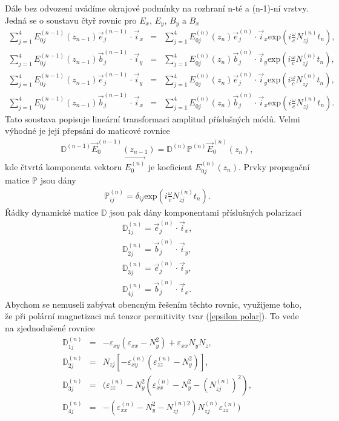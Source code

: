 Dále bez odvození uvádíme okrajové podmínky na rozhraní n-té a (n-1)-ní vrstvy. Jedná se o soustavu čtyř rovnic pro $E_x$, $E_y$, $B_y$ a $B_x$
\begin{eqnarray}
\sum^4_{j=1}E_{0j}^{(n-1)}(z_{n-1})\vec{e}_j^{(n-1)}\cdot\vec{i}_x &=& \sum^4_{j=1}E_{0j}^{(n)}(z_n)\vec{e}_j^{(n)}\cdot\vec{i}_x \mbox{exp}\left(i\frac{\omega}{c}N_{zj}^{(n)}t_n\right), \\
\sum^4_{j=1}E_{0j}^{(n-1)}(z_{n-1})\vec{b}_j^{(n-1)}\cdot\vec{i}_y &=& \sum^4_{j=1}E_{0j}^{(n)}(z_n)\vec{b}_j^{(n)}\cdot\vec{i}_y \mbox{exp}\left(i\frac{\omega}{c}N_{zj}^{(n)}t_n\right), \\
\sum^4_{j=1}E_{0j}^{(n-1)}(z_{n-1})\vec{e}_j^{(n-1)}\cdot\vec{i}_y &=& \sum^4_{j=1}E_{0j}^{(n)}(z_n)\vec{e}_j^{(n)}\cdot\vec{i}_y \mbox{exp}\left(i\frac{\omega}{c}N_{zj}^{(n)}t_n\right), \\
\sum^4_{j=1}E_{0j}^{(n-1)}(z_{n-1})\vec{b}_j^{(n-1)}\cdot\vec{i}_x &=& \sum^4_{j=1}E_{0j}^{(n)}(z_n)\vec{b}_j^{(n)}\cdot\vec{i}_x \mbox{exp}\left(i\frac{\omega}{c}N_{zj}^{(n)}t_n\right).
\end{eqnarray}
Tato soustava popisuje lineární transformaci amplitud příslušných módů. Velmi výhodné je její přepsání do maticové rovnice
\begin{eqnarray}
\mathbb{D}^{(n-1)}\vec{E}_0^{(n-1)}(z_{n-1})=\mathbb{D}^{(n)}\mathbb{P}^{(n)}\vec{E}^{(n)}_0(z_n),
\end{eqnarray}
kde čtvrtá komponenta vektoru $\vec{E_0^{(n)}}$ je koeficient $E^{(n)}_{0j}(z_n)$. Prvky propagační matice $\mathbb{P}$ jsou dány
\begin{eqnarray}
\mathbb{P}_{ij}^{(n)}=\delta_{ij} \mbox{exp}\left(i\frac{\omega}{c}N_{zj}^{(n)}t_n\right).
\end{eqnarray}
Řádky dynamické matice $\mathbb{D}$ jsou pak dány komponentami příslušných polarizací
\begin{eqnarray}
\mathbb{D}_{1j}^{(n)}=\vec{e}_j^{(n)}\cdot\vec{i}_x, \\
\mathbb{D}_{2j}^{(n)}=\vec{b}_j^{(n)}\cdot\vec{i}_y, \\
\mathbb{D}_{3j}^{(n)}=\vec{e}_j^{(n)}\cdot\vec{i}_y, \\
\mathbb{D}_{4j}^{(n)}=\vec{b}_j^{(n)}\cdot\vec{i}_x.
\end{eqnarray}
Abychom se nemuseli zabývat obencným řešením těchto rovnic, využijeme toho, že při polární magnetizaci má tenzor permitivity tvar (\ref{epsilon polar}). To vede na zjednodušené rovnice
\begin{eqnarray}
\mathbb{D}_{1j}^{(n)}&=& -\varepsilon_{xy}(\varepsilon_{xx}-N_y^2)+\varepsilon_{xx}N_yN_z, \\
\mathbb{D}_{2j}^{(n)}&=&N_{zj}[-\varepsilon_{xy}^{(n)}(\varepsilon_{zz}^{(n)}-N_y^2)], \\
\mathbb{D}_{3j}^{(n)}&=&(\varepsilon_{zz}^{(n)}-N^2_y(\varepsilon_{xx}^{(n)}-N_y^2-(N_{zj}^{(n)})^2), \\
\mathbb{D}_{4j}^{(n)}&=&-(\varepsilon_{xx}^{(n)}-N_y^2-N_{zj}^{(n)2})N_{zj}^{(n)}\varepsilon_{zz}^{(n)})
\end{eqnarray}
